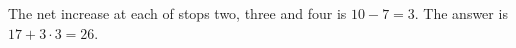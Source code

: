 The net increase at each of stops two, three and four is $10-7=3$. The answer is $17+3\cdot3=\boxed{26}$.
